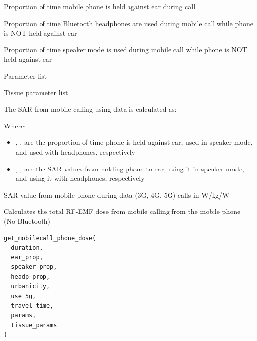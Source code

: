 \documentclass[a4paper]{book}
\begin{document}
%
\begin{Arguments}
\begin{ldescription}
\item[\code{ear\_prop}] Proportion of time mobile phone is held against ear during call

\item[\code{headp\_prop}] Proportion of time Bluetooth headphones are used during mobile call while phone is NOT held against ear

\item[\code{speaker\_prop}] Proportion of time speaker mode is used during mobile call while phone is NOT held against ear

\item[\code{params}] Parameter list

\item[\code{tissue\_params}] Tissue parameter list
\end{ldescription}
\end{Arguments}
%
\begin{Details}
The SAR from mobile calling using data is calculated as:

Where:
\begin{itemize}

\item{} , ,  are the proportion of time phone is held against ear, used in speaker mode, and used with headphones, respectively
\item{} , ,  are the SAR values from holding phone to ear, using it in speaker mode, and using it with headphones, respectively

\end{itemize}

\end{Details}
%
\begin{Value}
SAR value from mobile phone during data (3G, 4G, 5G) calls in W/kg/W
\end{Value}
%
\begin{Description}
Calculates the total RF-EMF dose from mobile calling from the mobile phone
(No Bluetooth)
\end{Description}
%
\begin{Usage}
\begin{verbatim}
get_mobilecall_phone_dose(
  duration,
  ear_prop,
  speaker_prop,
  headp_prop,
  urbanicity,
  use_5g,
  travel_time,
  params,
  tissue_params
)
\end{verbatim}
\end{Usage}
\end{document}
